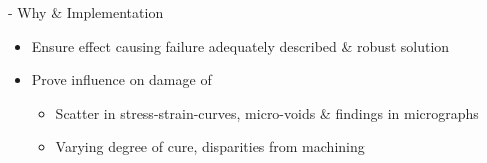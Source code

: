 \begin{frame}[t]{\secname}{\subsecname{} - Why \& Implementation}

\begin{itemize}
  \item Ensure effect causing failure adequately described \& robust solution
  \item Prove influence on damage of
  \begin{itemize}[noitemsep]
    \item Scatter in stress-strain-curves, micro-voids \& findings in micrographs
    \item Varying degree of cure, disparities from machining
  \end{itemize}
\end{itemize}

\setlength{\figheight}{0.475\textheight}
\begin{columns}[t]
  \begin{column}{0.5\textwidth}
  \end{column}
  \begin{column}{0.5\textwidth}
  \end{column}
\end{columns}
  
\end{frame}


